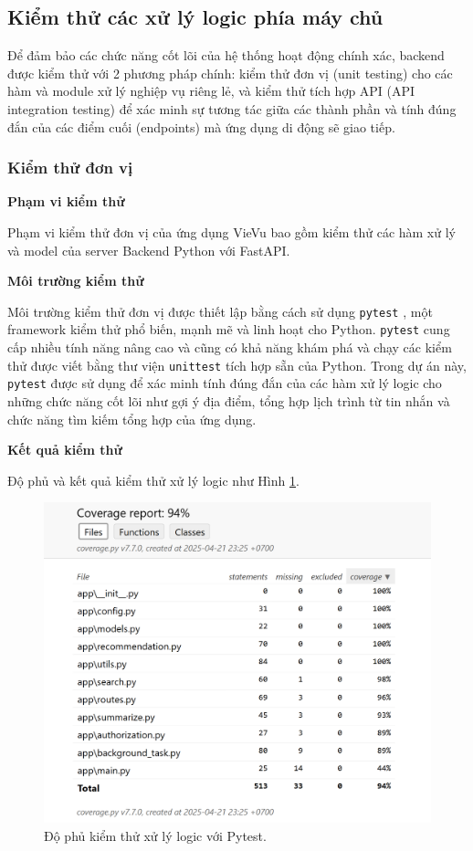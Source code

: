
\subsection{Kiểm thử các xử lý logic phía máy chủ}

Để đảm bảo các chức năng cốt lõi của hệ thống hoạt động chính xác, backend được kiểm thử với 2 phương pháp chính: kiểm thử đơn vị (unit testing) cho các hàm và module xử lý nghiệp vụ riêng lẻ, và kiểm thử tích hợp API (API integration testing) để xác minh sự tương tác giữa các thành phần và tính đúng đắn của các điểm cuối (endpoints) mà ứng dụng di động sẽ giao tiếp.

\subsubsection{Kiểm thử đơn vị}

\textbf{Phạm vi kiểm thử}

\noindent Phạm vi kiểm thử đơn vị của ứng dụng VieVu bao gồm kiểm thử các hàm xử lý và model của server Backend Python với FastAPI. 

\noindent
\textbf{Môi trường kiểm thử}

\noindent Môi trường kiểm thử đơn vị được thiết lập bằng cách sử dụng \texttt{pytest} \cite{pytest}, một framework kiểm thử phổ biến, mạnh mẽ và linh hoạt cho Python. \texttt{pytest} cung cấp nhiều tính năng nâng cao và cũng có khả năng khám phá và chạy các kiểm thử được viết bằng thư viện \texttt{unittest} tích hợp sẵn của Python. Trong dự án này, \texttt{pytest} được sử dụng để xác minh tính đúng đắn của các hàm xử lý logic cho những chức năng cốt lõi như gợi ý địa điểm, tổng hợp lịch trình từ tin nhắn và chức năng tìm kiếm tổng hợp của ứng dụng.

\noindent
\textbf{Kết quả kiểm thử}

\noindent Độ phủ và kết quả kiểm thử xử lý logic như Hình \ref{fig:pytest-testing}.

\begin{figure}[H]
    \centering  
    \includegraphics[width=1\textwidth]{figures/c4/unittest.png}
    \caption{Độ phủ kiểm thử xử lý logic với Pytest.}
    \label{fig:pytest-testing}
\end{figure}


